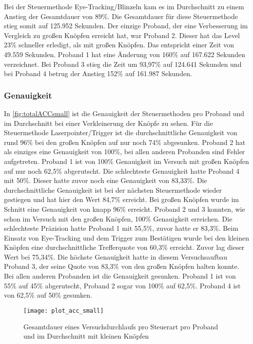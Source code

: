 Bei der Steuermethode Eye-Tracking/Blinzeln kam es im Durchschnitt zu einem Anstieg der Gesamtdauer von 89\%. Die Gesamtdauer für diese Steuermethode stieg somit auf 125.952 Sekunden. Der einzige Proband, der eine Verbesserung im Vergleich zu großen Knöpfen erreicht hat, war Proband 2. Dieser hat das Level 23\% schneller erledigt, als mit großen Knöpfen. Das entspricht einer Zeit von 49.559 Sekunden. Proband 1 hat eine Änderung von 160\% auf 167.622 Sekunden verzeichnet. Bei Proband 3 stieg die Zeit um 93,97\% auf 124.641 Sekunden und bei Proband 4 betrug der Anstieg 152\% auf 161.987 Sekunden. 

\subsubsection{Genauigkeit}
In \autoref{fig:totalACCsmall} ist die Genauigkeit der Steuermethoden pro Proband und im Durchschnitt bei einer Verkleinerung der Knöpfe zu sehen. Für die Steuermethode Laserpointer/Trigger ist die durchschnittliche Genauigkeit von rund 96\% bei den großen Knöpfen auf nur noch 74\% abgesunken. Proband 2 hat als einziges eine Genauigkeit von 100\%, bei allen anderen Probanden sind Fehler aufgetreten. Proband 1 ist von 100\% Genauigkeit im Versuch mit großen Knöpfen auf nur noch 62,5\% abgerutscht. Die schlechteste Genauigkeit hatte Proband 4 mit 50\%. Dieser hatte zuvor noch eine Genauigkeit von 83,33\%. Die durchschnittliche Genauigkeit ist bei der nächsten Steuermethode wieder gestiegen und hat hier den Wert 84,7\% erreicht. Bei großen Knöpfen wurde im Schnitt eine Genauigkeit von knapp 96\% erreicht. Proband 2 und 3 konnten, wie schon im Versuch mit den großen Knöpfen, 100\% Genauigkeit erreichen. Die schlechteste Präzision hatte Proband 1 mit 55,5\%, zuvor hatte er 83,3\%. Beim Einsatz von Eye-Tracking und dem Trigger zum Bestätigen wurde bei den kleinen Knöpfen eine durchschnittliche Trefferquote von 60,3\% erreicht. Zuvor lag dieser Wert bei 75,34\%. Die höchste Genauigkeit hatte in diesem Versuchsaufbau Proband 3, der seine Quote von 83,3\% von den großen Knöpfen halten konnte. Bei allen anderen Probanden ist die Genauigkeit gesunken. Proband 1 ist von 55\% auf 45\% abgerutscht, Proband 2 sogar von 100\% auf 62,5\%. Proband 4 ist von 62,5\% auf 50\% gesunken.

\begin{figure}[!htbp]
	\centering
	\texttt{[image: plot\_acc\_small]}
	\caption[Gesamtdauer eines Versuchdurchlaufs pro Steuerart pro Proband und im Durchschnitt mit kleinen Knöpfen]{Gesamtdauer eines Versuchdurchlaufs pro Steuerart pro Proband und im Durchschnitt mit kleinen Knöpfen}
	\label{fig:totalACCsmall}
\end{figure}


